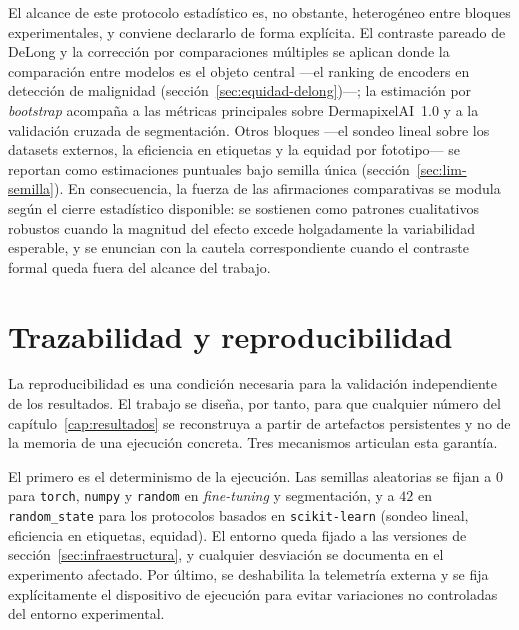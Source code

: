 El alcance de este protocolo estadístico es, no obstante, heterogéneo
entre bloques experimentales, y conviene declararlo de forma
explícita. El contraste pareado de DeLong y la corrección por
comparaciones múltiples se aplican donde la comparación entre modelos
es el objeto central ---el ranking de encoders en detección de
malignidad (sección~\ref{sec:equidad-delong})---; la estimación por
\emph{bootstrap} acompaña a las métricas principales sobre
DermapixelAI~1.0 y a la validación cruzada de segmentación. Otros
bloques ---el sondeo lineal sobre los datasets externos, la eficiencia
en etiquetas y la equidad por fototipo--- se reportan como
estimaciones puntuales bajo semilla única
(sección~\ref{sec:lim-semilla}). En consecuencia, la fuerza de las
afirmaciones comparativas se modula según el cierre estadístico
disponible: se sostienen como patrones cualitativos robustos cuando la
magnitud del efecto excede holgadamente la variabilidad esperable, y
se enuncian con la cautela correspondiente cuando el contraste formal
queda fuera del alcance del trabajo.

\section{Trazabilidad y reproducibilidad}
\label{sec:reproducibilidad}

La reproducibilidad es una condición necesaria para la validación
independiente de los resultados. El trabajo se diseña, por tanto,
para que cualquier número del capítulo~\ref{cap:resultados} se
reconstruya a partir de artefactos persistentes y no de la memoria
de una ejecución concreta. Tres mecanismos articulan esta garantía.

El primero es el determinismo de la ejecución. Las semillas
aleatorias se fijan a $0$ para \texttt{torch}, \texttt{numpy} y
\texttt{random} en \emph{fine-tuning} y segmentación, y a $42$ en
\texttt{random\_state} para los protocolos basados en
\texttt{scikit-learn} (sondeo lineal, eficiencia en etiquetas,
equidad). El entorno queda fijado a las versiones de
sección~\ref{sec:infraestructura}, y cualquier desviación se
documenta en el experimento afectado. Por último, se deshabilita la
telemetría externa y se fija explícitamente el dispositivo de
ejecución para evitar variaciones no controladas del entorno
experimental.


